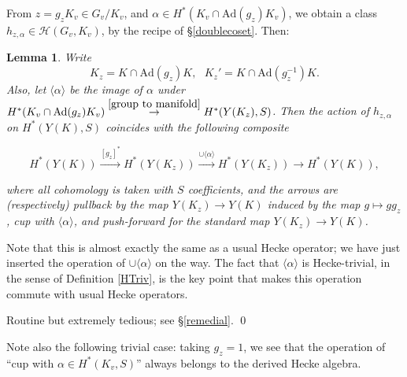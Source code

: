 \documentclass[10pt]{amsart}
\newcommand{\Ad}{\mathrm{Ad}}
\newtheorem{lemma}[subsection]{Lemma}
\theoremstyle{remark}
\begin{document}
From  $z = g_z K_v \in G_v/K_v$,
and $\alpha \in H^*(K_v \cap \Ad(g_z) K_v)$,  we obtain a class $h_{z, \alpha} \in \mathscr{H}(G_v, K_v)$, by the recipe of \S \ref{doublecoset}.  Then:

\begin{lemma}
Write  $$K_z = K \cap \Ad(g_z) K,  \ \ \  K_z' = K \cap \Ad(g_z^{-1}) K.$$
Also, let $\langle \alpha \rangle$ be the image of $\alpha$ under  $H^*(K_v \cap \Ad(g_z) K_v)  \stackrel{\eqref{group to manifold}}{\rightarrow} H^*(Y(K_z), S)$.   
Then the action of $h_{z,\alpha}$ on $H^*(Y(K),S)$ coincides with the following composite 

 \begin{equation} \label{action-explicit} H^*(Y(K))  \stackrel{[g_z]^*}{\rightarrow} H^*( Y(K_z))  \stackrel{\cup \langle \alpha \rangle}{\rightarrow} H^*(Y(K_z))  \rightarrow H^*(Y(K)),\end{equation}

where all cohomology is taken with $S$ coefficients, 
and  the arrows are (respectively) pullback by the map $Y(K_z) \rightarrow Y(K)$ induced
by the map $g \mapsto g g_z$, 
  cup with $\langle \alpha \rangle$, and push-forward for the standard map $Y(K_z) \rightarrow Y(K)$.  
 \end{lemma}
 
  Note that this is almost exactly the same as a usual Hecke operator; we have just inserted the operation of $\cup \langle \alpha \rangle$ on the way. 
  The fact that $\langle \alpha \rangle$ is Hecke-trivial, in the sense of Definition \ref{HTriv},  is the key point that makes this operation commute with usual Hecke operators.


  \proof
Routine but extremely tedious; see \S \ref{remedial}.
\qed 



 
 \medskip
 

  Note also the following trivial case: taking $g_z = 1$, we see that  the operation of ``cup with $\alpha \in H^*(K_v, S)$''
always belongs to the  derived Hecke algebra. 

\medskip
 
\end{document}
